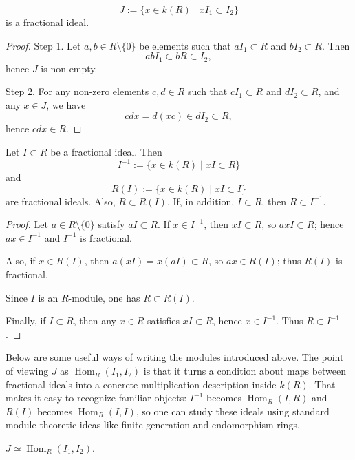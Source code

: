 \begin{lemma}
\label{lemma-fractional-hom-ideal}
$$
J:=\{x\in k(R)\mid xI_1\subset I_2\}
$$
is a fractional ideal.
\end{lemma}

\begin{proof}
Step 1. Let $a,b\in R\setminus\{0\}$ be
elements such that $aI_1\subset R$ and
$bI_2\subset R$. Then
$$
abI_1\subset bR\subset I_2,
$$
hence $J$ is non-empty.

Step 2. For any non-zero elements
$c,d\in R$ such that $cI_1\subset R$ and
$dI_2\subset R$, and any $x\in J$, we have
$$
cdx=d(xc)\in dI_2\subset R,
$$
hence $cdx\in R$.
\end{proof}

\begin{lemma}
\label{lemma-fractional-inverse-r}
Let $I\subset R$ be a fractional ideal.
Then
$$
I^{-1}:=\{x\in k(R)\mid xI\subset R\}
$$
and
$$
R(I):=\{x\in k(R)\mid xI\subset I\}
$$
are fractional ideals.
Also, $R\subset R(I)$.
If, in addition, $I\subset R$, then
$R\subset I^{-1}$.
\end{lemma}

\begin{proof}
Let $a\in R\setminus\{0\}$ satisfy
$aI\subset R$. If $x\in I^{-1}$, then
$xI\subset R$, so $a x I\subset R$; hence
$ax\in I^{-1}$ and $I^{-1}$ is fractional.

Also, if $x\in R(I)$, then
$a(xI)=x(aI)\subset R$, so $ax\in R(I)$;
thus $R(I)$ is fractional.

Since $I$ is an $R$-module, one has
$R\subset R(I)$.

Finally, if $I\subset R$, then any $x\in R$
satisfies $xI\subset R$, hence $x\in I^{-1}$.
Thus $R\subset I^{-1}$.
\end{proof}

\noindent
Below are some useful ways
of writing the modules introduced above.
The point of viewing $J$ as
$\operatorname{Hom}_R(I_1,I_2)$ is that it
turns a condition about maps between
fractional ideals into a concrete
multiplication description inside $k(R)$.
That makes it easy to recognize familiar
objects: $I^{-1}$ becomes
$\operatorname{Hom}_R(I,R)$ and $R(I)$
becomes $\operatorname{Hom}_R(I,I)$, so one
can study these ideals using standard
module-theoretic ideas like finite generation
and endomorphism rings.

\begin{lemma}
\label{lemma-fractional-hom-iso}
$J\simeq \operatorname{Hom}_R(I_1,I_2)$.
\end{lemma}

